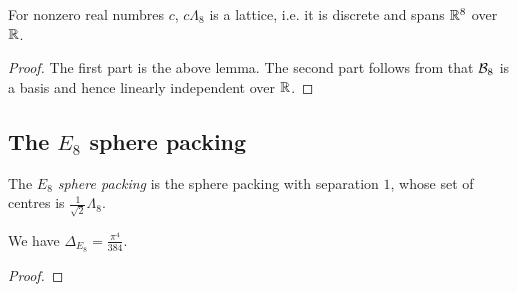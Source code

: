 \begin{lemma}\label{instLatticeE8}\leanok
  For nonzero real numbres $c$, $c\Lambda_8$ is a lattice, i.e. it is discrete and spans $\mathbb{R}^8$ over $\mathbb{R}$.
\end{lemma}
\begin{proof}\leanok
  The first part is the above lemma. The second part follows from that $\mathcal{B}_8$ is a basis and hence linearly independent over $\mathbb{R}$.
\end{proof}


\subsection{The $E_8$ sphere packing}

\begin{definition}\label{E8Packing}\leanok
  The \emph{$E_8$ sphere packing} is the sphere packing with separation $1$, whose set of centres is $\frac{1}{\sqrt{2}}\Lambda_8$.
\end{definition}

\begin{theorem}\label{E8Packing_density}
  We have $\Delta_{E_8} = \frac{\pi^4}{384}$.
\end{theorem}
\begin{proof}
\end{proof}

